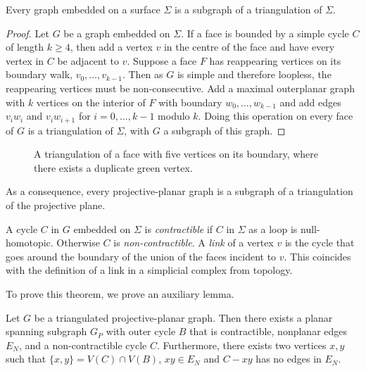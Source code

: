 \begin{theorem}\label{thm:triangulation_subgraph}
    Every graph embedded on a surface $\Sigma$ is a subgraph of a triangulation of $\Sigma$.
\end{theorem}

\begin{proof}
    Let $G$ be a graph embedded on $\Sigma$. If a face is bounded by a simple cycle $C$ of length $k \geq 4$, then add a vertex $v$ in the centre of the face and have every vertex in $C$ be adjacent to $v$. Suppose a face $F$ has reappearing vertices on its boundary walk, $v_0, \ldots, v_{k-1}$. Then as $G$ is simple and therefore loopless, the reappearing vertices must be non-consecutive. Add a maximal outerplanar graph with $k$ vertices on the interior of $F$ with boundary $w_0, \ldots, w_{k-1}$ and add edges $v_i w_i$ and $v_i w_{i + 1}$ for $i = 0, \ldots, {k-1}$ modulo $k$. Doing this operation on every face of $G$ is a triangulation of $\Sigma$, with $G$ a subgraph of this graph.  
\end{proof}
\begin{figure}[h]
    \centering
    
    \caption[Face triangulation]{A triangulation of a face with five vertices on its boundary, where there exists a duplicate green vertex.}\label{fig:triangulation}
\end{figure}
As a consequence, every projective-planar graph is a subgraph of a triangulation of the projective plane. 

A cycle $C$ in $G$ embedded on $\Sigma$ is \textit{contractible} if $C$ in $\Sigma$ as a loop is null-homotopic. Otherwise $C$ is \textit{ non-contractible}. 
A \textit{link} of a vertex $v$ is the cycle that goes around the boundary of the union of the faces incident to $v$. This coincides with the definition of a link in a simplicial complex from topology. 

To prove this theorem, we prove an auxiliary lemma. 

\begin{lemma}\label{lem:proj_planar triangulation}
    Let $G$ be a triangulated projective-planar graph. Then there exists a planar spanning subgraph $G_P$ with outer cycle $B$ that is contractible, nonplanar edges $E_N$, and a non-contractible cycle $C$. Furthermore, there exists two vertices $x, y$ such that $\{x, y \} = V(C) \cap V(B)$, $xy \in E_N$ and $C - xy$ has no edges in $E_N$. 
\end{lemma}

